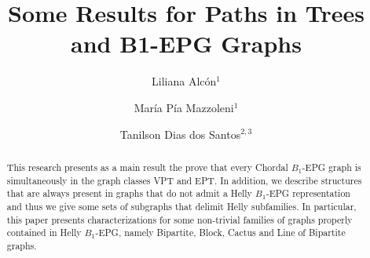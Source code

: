 \documentclass[9pt]{entcs}
\begin{document}


\begin{frontmatter}
  \title{Some Results for Paths in Trees and B1-EPG Graphs}
  
  
  
	\author{Liliana Alc\'{o}n$^{1}$}
	\author{Mar\'{i}a P\'{i}a Mazzoleni$^{1}$}
	\author{Tanilson Dias dos Santos$^{2,3}$}
	
	\address{$^{1}$Universidad Nacional de La Plata, La Plata, Argentina.\\$^{2}$Universidade Federal do Rio de Janeiro - UFRJ, Brazil. \\$^{3}$Universidade Federal do Tocantins - UFT, Brazil.}
	
	
	
	
	
	
	
	

\begin{abstract}
This research presents as a main result the prove that every Chordal $B_1$-EPG graph is simultaneously in the graph classes VPT and EPT. In addition, we  describe structures that are always present in graphs that do not admit a Helly $B_1$-EPG representation and thus we give some sets of subgraphs that delimit Helly subfamilies.   
In particular, this paper presents characterizations for some non-trivial families of graphs properly contained in Helly $B_1$-EPG, namely Bipartite, Block, Cactus and Line of Bipartite  graphs. 
\end{abstract}


\end{frontmatter}
\end{document}
